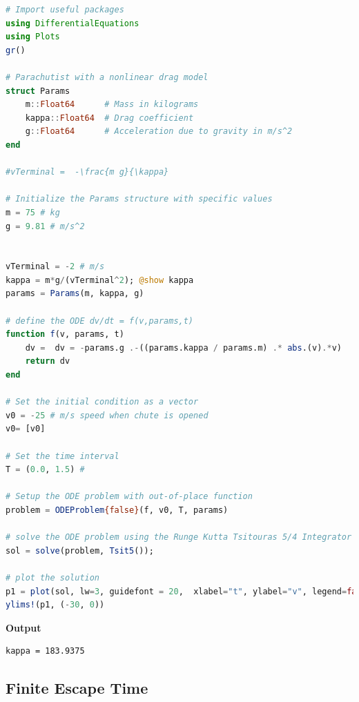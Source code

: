 \begin{lstlisting}[language=Julia,style=mystyle]
# Import useful packages
using DifferentialEquations
using Plots 
gr()

# Parachutist with a nonlinear drag model
struct Params
    m::Float64      # Mass in kilograms
    kappa::Float64  # Drag coefficient
    g::Float64      # Acceleration due to gravity in m/s^2
end

#vTerminal =  -\frac{m g}{\kappa}

# Initialize the Params structure with specific values
m = 75 # kg
g = 9.81 # m/s^2


vTerminal = -2 # m/s
kappa = m*g/(vTerminal^2); @show kappa
params = Params(m, kappa, g)

# define the ODE dv/dt = f(v,params,t)
function f(v, params, t)
    dv =  dv = -params.g .-((params.kappa / params.m) .* abs.(v).*v)
    return dv
end

# Set the initial condition as a vector
v0 = -25 # m/s speed when chute is opened
v0= [v0]

# Set the time interval
T = (0.0, 1.5) # 

# Setup the ODE problem with out-of-place function
problem = ODEProblem{false}(f, v0, T, params)

# solve the ODE problem using the Runge Kutta Tsitouras 5/4 Integrator
sol = solve(problem, Tsit5());

# plot the solution
p1 = plot(sol, lw=3, guidefont = 20,  xlabel="t", ylabel="v", legend=false, color=:blue)
ylims!(p1, (-30, 0))
\end{lstlisting}
\textbf{Output} 
\begin{verbatim}
kappa = 183.9375
\end{verbatim}

\subsection{Finite Escape Time}

